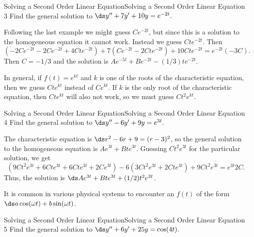 \begin{example}{Solving a Second Order Linear Equation}{Solving a Second Order Linear Equation 3}\label{Solving a Second Order Linear Equation 3}
 Find the general solution to 
$\ds y''+7y'+10y=e^{-2t}.$
\end{example}

\begin{solution}
Following the last example we might guess
$Ce^{-2t}$, but since this is a solution to the homogeneous equation
it cannot work. Instead we guess $Cte^{-2t}$. Then
$$
(-2Ce^{-2t}-2Ce^{-2t}+4Cte^{-2t})+7(Ce^{-2t}-2Cte^{-2t})+10Cte^{-2t}
=e^{-2t}(-3C).
$$
Then $C=-1/3$ and the solution is $Ae^{-5t}+Be^{-2t}-(1/3)te^{-2t}$.
\end{solution}

In general, if $f(t)=e^{kt}$ and $k$ is one of the roots of the
characteristic equation, then we guess $Cte^{kt}$ instead of
$Ce^{kt}$. If $k$ is the only root of the characteristic equation,
then $Cte^{kt}$ will also not work, so we must guess $Ct^2e^{kt}$.

\begin{example}{Solving a Second Order Linear Equation}{Solving a Second Order Linear Equation 4}\label{Solving a Second Order Linear Equation 4}
 Find the general solution to 
$\ds y''-6y'+9y=e^{3t}.$
\end{example}

\begin{solution}
The characteristic equation is 
$\ds r^2-6r+9=(r-3)^2$, so the general solution to the homogeneous
equation is $Ae^{3t}+Bte^{3t}$. Guessing $Ct^2e^{3t}$ for the
particular solution, we get
$$
(9Ct^2e^{3t}+6Cte^{3t}+6Cte^{3t}+2Ce^{3t})-6(3Ct^2e^{3t}+2Cte^{3t})+9Ct^2e^{3t}
=e^{3t}2C.
$$
Thus, the solution is $\ds Ae^{3t}+Bte^{3t}+(1/2)t^2e^{3t}$.
\end{solution}

It is common in various physical systems to encounter an $f(t)$ of the
form $\ds a\cos(\omega t)+b\sin(\omega t)$.

\begin{example}{Solving a Second Order Linear Equation}{Solving a Second Order Linear Equation 5}\label{Solving a Second Order Linear Equation 5}
 Find the general solution to 
$\ds y''+6y'+25y=\cos(4t).$
\end{example}

